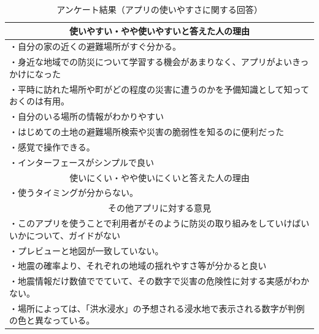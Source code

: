 \documentclass[a4paper]{jsarticle}
\begin{document}
\begin{enumerate}
\begin{enumerate}
    \begin{table}[H]
      \begin{center}
        \caption{アンケート結果（アプリの使いやすさに関する回答）}
        \renewcommand\arraystretch{1.2}
        \begin{tabular}{|p{15cm}|}
          \hline
          \multicolumn{1}{|c|}{使いやすい・やや使いやすいと答えた人の理由} \\
          \hline
          ・自分の家の近くの避難場所がすぐ分かる。 \\
          ・身近な地域での防災について学習する機会があまりなく、アプリがよいきっかけになった \\
          ・平時に訪れた場所や町がどの程度の災害に遭うのかを予備知識として知っておくのは有用。\\
          ・自分のいる場所の情報がわかりやすい\\
          ・はじめての土地の避難場所検索や災害の脆弱性を知るのに便利だった\\
          ・感覚で操作できる。\\
          ・インターフェースがシンプルで良い\\
          \hline
          \hline
          \multicolumn{1}{|c|}{使いにくい・やや使いにくいと答えた人の理由} \\
          \hline
          ・使うタイミングが分からない。\\
          \hline
          \hline
          \multicolumn{1}{|c|}{その他アプリに対する意見} \\
          \hline
          ・このアプリを使うことで利用者がそのように防災の取り組みをしていけばいいかについて、ガイドがない \\
          ・プレビューと地図が一致していない。\\
          ・地震の確率より、それぞれの地域の揺れやすさ等が分かると良い \\
          ・地震情報だけ数値ででていて、その数字で災害の危険性に対する実感がわかない。\\
          ・場所によっては、「洪水浸水」の予想される浸水地で表示される数字が判例の色と異なっている。\\
          \hline
        \end{tabular}
        \label{tab:mbn-comment}
      \end{center}
    \end{table}


\end{enumerate}
\end{enumerate}
\end{document}
